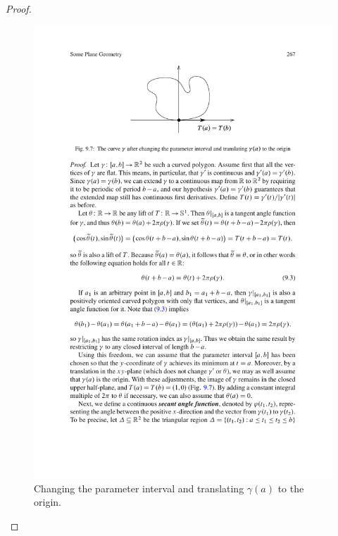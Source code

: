 \begin{proof}
\begin{figure}[htbp]
\includegraphics{pictures/rotation-index-theorem}
\caption{Changing the parameter interval and translating $\gamma(a)$ to the origin.}
\end{figure}


\end{proof}
